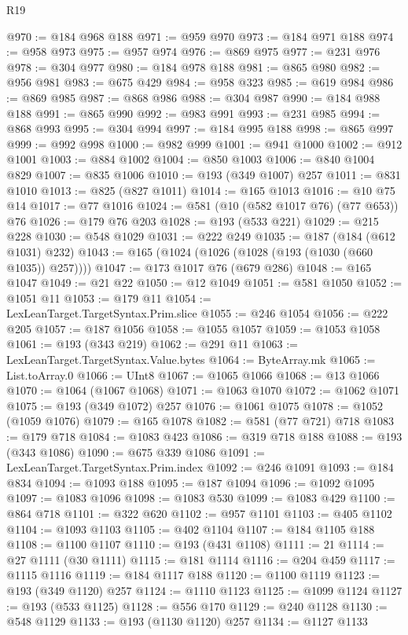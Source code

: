 \begin{lexlean}{R19}
\begin{coremodule}
@970 := @184 @968 @188
@971 := @959 @970
@973 := @184 @971 @188
@974 := @958 @973
@975 := @957 @974
@976 := @869 @975
@977 := @231 @976
@978 := @304 @977
@980 := @184 @978 @188
@981 := @865 @980
@982 := @956 @981
@983 := @675 @429
@984 := @958 @323
@985 := @619 @984
@986 := @869 @985
@987 := @868 @986
@988 := @304 @987
@990 := @184 @988 @188
@991 := @865 @990
@992 := @983 @991
@993 := @231 @985
@994 := @868 @993
@995 := @304 @994
@997 := @184 @995 @188
@998 := @865 @997
@999 := @992 @998
@1000 := @982 @999
@1001 := @941 @1000
@1002 := @912 @1001
@1003 := @884 @1002
@1004 := @850 @1003
@1006 := @840 @1004 @829
@1007 := @835 @1006
@1010 := @193 (@349 @1007) @257
@1011 := @831 @1010
@1013 := @825 (@827 @1011)
@1014 := @165 @1013
@1016 := @10 @75 @14
@1017 := @77 @1016
@1024 := @581 (@10 (@582 @1017 @76) (@77 @653)) @76
@1026 := @179 @76 @203
@1028 := @193 (@533 @221)
@1029 := @215 @228
@1030 := @548 @1029
@1031 := @222 @249
@1035 := @187 (@184 (@612 @1031) @232)
@1043 := @165 (@1024 (@1026 (@1028 (@193 (@1030 (@660 @1035)) @257))))
@1047 := @173 @1017 @76 (@679 @286)
@1048 := @165 @1047
@1049 := @21 @22
@1050 := @12 @1049
@1051 := @581 @1050
@1052 := @1051 @11
@1053 := @179 @11
@1054 := LexLeanTarget.TargetSyntax.Prim.slice
@1055 := @246 @1054
@1056 := @222 @205
@1057 := @187 @1056
@1058 := @1055 @1057
@1059 := @1053 @1058
@1061 := @193 (@343 @219)
@1062 := @291 @11
@1063 := LexLeanTarget.TargetSyntax.Value.bytes
@1064 := ByteArray.mk
@1065 := List.toArray.{0}
@1066 := UInt8
@1067 := @1065 @1066
@1068 := @13 @1066
@1070 := @1064 (@1067 @1068)
@1071 := @1063 @1070
@1072 := @1062 @1071
@1075 := @193 (@349 @1072) @257
@1076 := @1061 @1075
@1078 := @1052 (@1059 @1076)
@1079 := @165 @1078
@1082 := @581 (@77 @721) @718
@1083 := @179 @718
@1084 := @1083 @423
@1086 := @319 @718 @188
@1088 := @193 (@343 @1086)
@1090 := @675 @339 @1086
@1091 := LexLeanTarget.TargetSyntax.Prim.index
@1092 := @246 @1091
@1093 := @184 @834
@1094 := @1093 @188
@1095 := @187 @1094
@1096 := @1092 @1095
@1097 := @1083 @1096
@1098 := @1083 @530
@1099 := @1083 @429
@1100 := @864 @718
@1101 := @322 @620
@1102 := @957 @1101
@1103 := @405 @1102
@1104 := @1093 @1103
@1105 := @402 @1104
@1107 := @184 @1105 @188
@1108 := @1100 @1107
@1110 := @193 (@431 @1108)
@1111 := 21
@1114 := @27 @1111 (@30 @1111)
@1115 := @181 @1114
@1116 := @204 @459
@1117 := @1115 @1116
@1119 := @184 @1117 @188
@1120 := @1100 @1119
@1123 := @193 (@349 @1120) @257
@1124 := @1110 @1123
@1125 := @1099 @1124
@1127 := @193 (@533 @1125)
@1128 := @556 @170
@1129 := @240 @1128
@1130 := @548 @1129
@1133 := @193 (@1130 @1120) @257
@1134 := @1127 @1133

\end{coremodule}
\end{lexlean}
